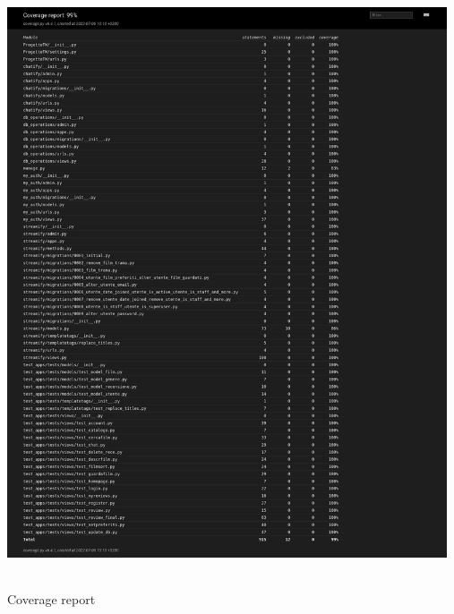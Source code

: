 \documentclass[12pt]{article}
\begin{document}
	\begin{center}
		\centering \includegraphics[width=13cm,height=18cm]{Immagini/coverage_report.png} \\
		\centering Coverage report	
	\end{center}
	\pagebreak
	
\end{document}
